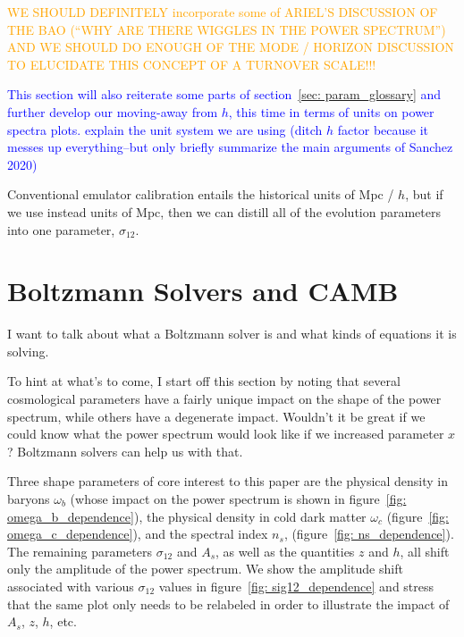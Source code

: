 
\textcolor{orange}{WE SHOULD DEFINITELY incorporate some of ARIEL'S DISCUSSION 
OF THE BAO 
(``WHY ARE THERE
WIGGLES IN THE POWER SPECTRUM'') AND WE SHOULD DO ENOUGH OF THE MODE / HORIZON
DISCUSSION TO ELUCIDATE THIS CONCEPT OF A TURNOVER SCALE!!!}


\textcolor{blue}{This section will also reiterate some parts of 
section~\ref{sec: param_glossary} and further develop our moving-away from 
$h$, this time in terms of units on power spectra plots. explain the unit system
    we are using (ditch $h$ factor because it messes up everything--but
    only briefly summarize the main arguments of Sanchez 2020)}


Conventional emulator calibration entails the historical units of Mpc / $h$,
but if we use instead units of Mpc, then we can distill all of the evolution
parameters into one parameter, $\sigma_{12}$. 


\section{Boltzmann Solvers and CAMB}
\label{sec: boltzmann_intro}

I want to talk about what a Boltzmann solver is and what kinds of equations it is solving.

To hint at what's to come, I start off this section by noting that several cosmological parameters have a fairly unique impact on the shape of the power spectrum, while others have a degenerate impact. Wouldn't it be great if we could know what the power spectrum would look like if we increased parameter $x$? Boltzmann solvers can help us with that.


Three shape parameters of core interest to this paper are the physical density in baryons $\omega_b$ (whose impact on the power spectrum is shown in figure~\ref{fig: omega_b_dependence}), the physical density in cold dark matter $\omega_c$ (figure~\ref{fig: omega_c_dependence}), and the spectral index $n_s$, (figure~\ref{fig: ns_dependence}). The remaining parameters $\sigma_{12}$ and $A_s$, as well as the quantities $z$ and $h$, all shift only the amplitude of the power spectrum. We show the amplitude shift associated with various $\sigma_{12}$ values in figure~\ref{fig: sig12_dependence} and stress that the same plot only needs to be relabeled in order to illustrate the impact of $A_s$, $z$, $h$, etc. 


